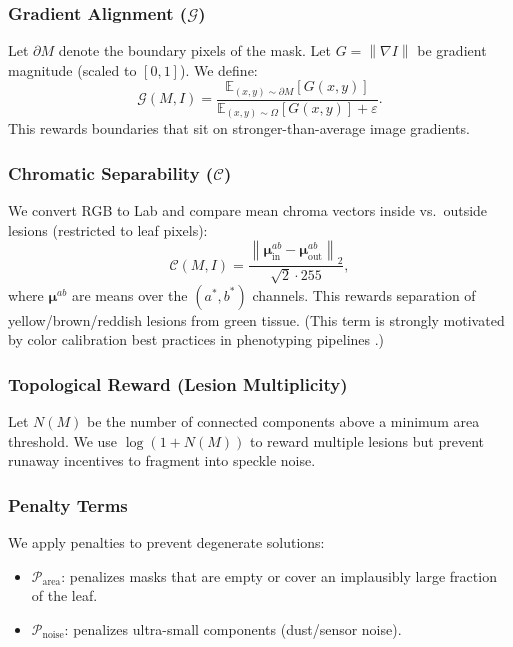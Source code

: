\documentclass[journal]{IEEEtran}
\newcommand{\E}{\mathbb{E}}
\newcommand{\grad}{\nabla}
\newcommand{\norm}[1]{\left\lVert #1 \right\rVert}
\begin{document}
\subsubsection{Gradient Alignment ($\mathcal{G}$)}
Let $\partial M$ denote the boundary pixels of the mask. Let $G=\norm{\grad I}$ be gradient magnitude (scaled to $[0,1]$). We define:
\begin{equation}
\mathcal{G}(M,I) = \frac{\E_{(x,y)\sim \partial M}[G(x,y)]}{\E_{(x,y)\sim \Omega}[G(x,y)] + \varepsilon}.
\end{equation}
This rewards boundaries that sit on stronger-than-average image gradients.

\subsubsection{Chromatic Separability ($\mathcal{C}$)}
We convert RGB to Lab and compare mean chroma vectors inside vs.\ outside lesions (restricted to leaf pixels):
\begin{equation}
\mathcal{C}(M,I) = \frac{\norm{\bm{\mu}_{\mathrm{in}}^{ab}-\bm{\mu}_{\mathrm{out}}^{ab}}_2}{\sqrt{2}\cdot 255},
\end{equation}
where $\bm{\mu}^{ab}$ are means over the $(a^\ast,b^\ast)$ channels. This rewards separation of yellow/brown/reddish lesions from green tissue. (This term is strongly motivated by color calibration best practices in phenotyping pipelines \cite{berry2018color,plantcv2025}.)

\subsubsection{Topological Reward (Lesion Multiplicity)}
Let $N(M)$ be the number of connected components above a minimum area threshold. We use $\log(1+N(M))$ to reward multiple lesions but prevent runaway incentives to fragment into speckle noise.

\subsubsection{Penalty Terms}
We apply penalties to prevent degenerate solutions:
\begin{itemize}
    \item $\mathcal{P}_{\mathrm{area}}$: penalizes masks that are empty or cover an implausibly large fraction of the leaf.
    \item $\mathcal{P}_{\mathrm{noise}}$: penalizes ultra-small components (dust/sensor noise).
\end{itemize}
\end{document}
